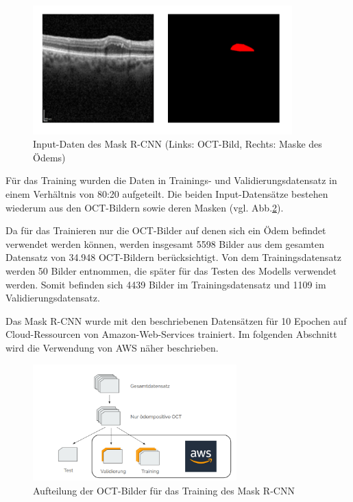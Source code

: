 \begin{figure}[H]
\centering
\includegraphics[width=100mm,scale=1.5]{pic/Segmentierung/input_mrcnn.png}
\caption{\label{input_mrcnn}Input-Daten des Mask R-CNN (Links: OCT-Bild, Rechts: Maske des Ödems)}
\end{figure}

Für das Training wurden die Daten in Trainings- und Validierungsdatensatz in einem Verhältnis von 80:20 aufgeteilt. Die beiden Input-Datensätze bestehen wiederum aus den OCT-Bildern sowie deren Masken (vgl. Abb.\ref{aufteilung_data}). 

Da für das Trainieren nur die OCT-Bilder auf denen sich ein Ödem befindet verwendet werden können, werden insgesamt 5598 Bilder aus dem gesamten Datensatz von 34.948 OCT-Bildern berücksichtigt. 
Von dem Trainingsdatensatz werden 50 Bilder entnommen, die später für das Testen des Modells verwendet werden. 
Somit befinden sich 4439 Bilder im Trainingsdatensatz und 1109 im Validierungsdatensatz. 

Das Mask R-CNN wurde mit den beschriebenen Datensätzen für 10 Epochen auf Cloud-Ressourcen von Amazon-Web-Services trainiert. Im folgenden Abschnitt wird die Verwendung von AWS näher beschrieben. 


\begin{figure}[H]
\centering
\includegraphics[width=0.7\textwidth]{pic/Segmentierung/training_segmentation.png}
\caption{\label{aufteilung_data}Aufteilung der OCT-Bilder für das Training des Mask R-CNN}
\end{figure}


